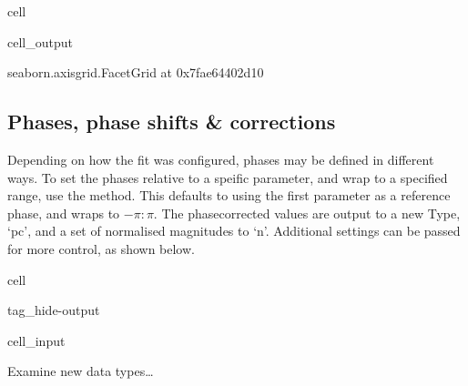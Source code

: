 \documentclass[letterpaper,table,10pt,english]{jupyterBook}
\begin{document}
\begin{sphinxuseclass}{cell}
\begin{sphinxVerbatimOutput}
\begin{sphinxuseclass}{cell_output}
\begin{sphinxVerbatim}[commandchars=\\\{\}]
\PYGZlt{}seaborn.axisgrid.FacetGrid at 0x7fae64402d10\PYGZgt{}
\end{sphinxVerbatim}

\noindent{}

\end{sphinxuseclass}\end{sphinxVerbatimOutput}

\end{sphinxuseclass}

\subsection{Phases, phase shifts \& corrections}
\label{\detokenize{part2/case-study-OCS_290723:phases-phase-shifts-corrections}}
\sphinxAtStartPar
Depending on how the fit was configured, phases may be defined in different ways. To set the phases relative to a speific parameter, and wrap to a specified range, use the  method. This defaults to using the first parameter as a reference phase, and wraps to \(-\pi:\pi\). The phase\sphinxhyphen{}corrected values are output to a new Type, ‘pc’, and a set of normalised magnitudes to ‘n’. Additional settings can be passed for more control, as shown below.

\begin{sphinxuseclass}{cell}
\begin{sphinxuseclass}{tag_hide-output}\begin{sphinxVerbatimInput}

\begin{sphinxuseclass}{cell_input}
\begin{sphinxVerbatim}[commandchars=\\\{\}]
 
\end{sphinxVerbatim}

\end{sphinxuseclass}\end{sphinxVerbatimInput}

\end{sphinxuseclass}
\end{sphinxuseclass}
\sphinxAtStartPar
Examine new data types…
\end{document}

